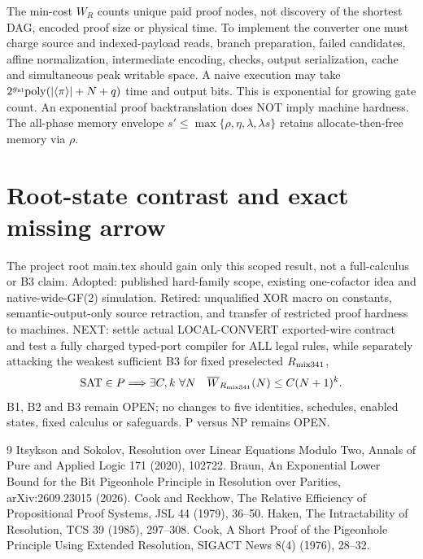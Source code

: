 \documentclass[11pt]{article}
\begin{document}
The min-cost $W_R$ counts unique paid proof nodes, not discovery of the shortest DAG, encoded proof size or physical time. To implement the converter one must charge source and indexed-payload reads, branch preparation, failed candidates, affine normalization, intermediate encoding, checks, output serialization, cache and simultaneous peak writable space. A naive execution may take $2^{g_{\rm nl}}\mathrm{poly}(|\langle\pi\rangle|+N+q)$ time and output bits. This is exponential for growing gate count. An exponential proof backtranslation does NOT imply machine hardness. The all-phase memory envelope $s'\le\max\{\rho,\eta,\lambda,\lambda s\}$ retains allocate-then-free memory via $\rho$.

\section*{Root-state contrast and exact missing arrow}
The project root main.tex should gain only this scoped result, not a full-calculus or B3 claim. Adopted: published hard-family scope, existing one-cofactor idea and native-wide-GF(2) simulation. Retired: unqualified XOR macro on constants, semantic-output-only source retraction, and transfer of restricted proof hardness to machines. NEXT: settle actual LOCAL-CONVERT exported-wire contract and test a fully charged typed-port compiler for ALL legal rules, while separately attacking the weakest sufficient B3 for fixed preselected $R_{\rm mix341}$,
\[
\mathrm{SAT}\in P\Longrightarrow
\exists C,k\ \forall N\quad\overline W_{R_{\rm mix341}}(N)\le C(N+1)^k.
\]
B1, B2 and B3 remain OPEN; no changes to five identities, schedules, enabled states, fixed calculus or safeguards. P versus NP remains OPEN.

\begin{thebibliography}{9}
 Itsykson and Sokolov, Resolution over Linear Equations Modulo Two, Annals of Pure and Applied Logic 171 (2020), 102722.
 Braun, An Exponential Lower Bound for the Bit Pigeonhole Principle in Resolution over Parities, arXiv:2609.23015 (2026).
 Cook and Reckhow, The Relative Efficiency of Propositional Proof Systems, JSL 44 (1979), 36--50.
 Haken, The Intractability of Resolution, TCS 39 (1985), 297--308.
 Cook, A Short Proof of the Pigeonhole Principle Using Extended Resolution, SIGACT News 8(4) (1976), 28--32.
\end{thebibliography}
\end{document}
